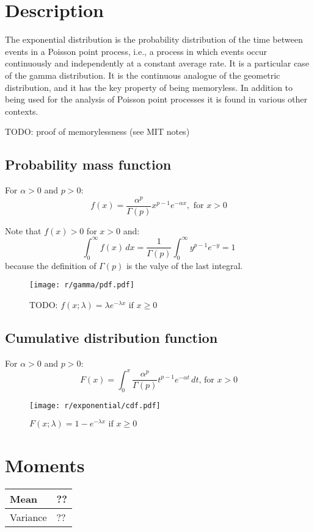 \section{Description}
The exponential distribution is the probability distribution of the time between events in a Poisson point process, i.e., a process in which events occur continuously and independently at a constant average rate. It is a particular case of the gamma distribution. It is the continuous analogue of the geometric distribution, and it has the key property of being memoryless. In addition to being used for the analysis of Poisson point processes it is found in various other contexts.

TODO: proof of memorylessness (see MIT notes)

\subsection{Probability mass function}
For $\alpha > 0$ and $p > 0$:
\[
	f(x) = \frac{\alpha^p}{\Gamma(p)} x^{p - 1} e^{-\alpha x}, \text{ for } x > 0
\]

Note that $f(x) > 0$ for $x > 0$ and:
\[
	\int_0^\infty f(x) \, dx = \frac{1}{\Gamma(p)} \int_0^\infty y^{p - 1} e^{-y} = 1
\]
because the definition of $\Gamma(p)$ is the valye of the last integral.

\begin{figure}[H]
	\texttt{[image: r/gamma/pdf.pdf]}
	\caption{TODO: $f(x; \lambda) = \lambda e^{-\lambda x} \text{ if } x \geq 0$}
\end{figure}

\subsection{Cumulative distribution function}
For $\alpha > 0$ and $p > 0$:
\[
	F(x) = \int_0^x \frac{\alpha^p}{\Gamma(p)} t^{p - 1} e^{-\alpha t} \, dt \text{, for } x > 0
\]

\begin{figure}[H]
	\texttt{[image: r/exponential/cdf.pdf]}
	\caption{$F(x; \lambda) = 1 - e^{-\lambda x} \text{ if } x \geq 0$}
\end{figure}


\section{Moments}

\begin{tabularx}{\textwidth}{s X}
	\hline
	Mean & ?? \\\hline
	Variance & ?? \\\hline
\end{tabularx}


